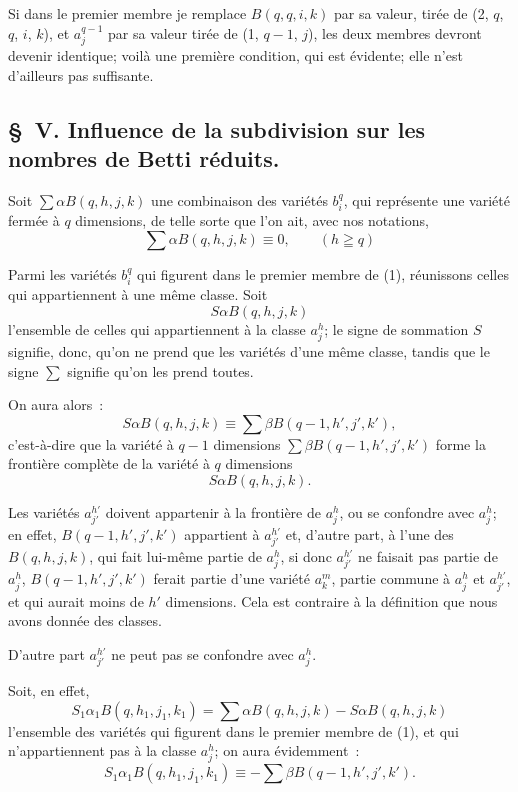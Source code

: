 \documentclass{article}
\begin{document}
Si dans le premier membre je remplace $B(q, q, i, k)$ par sa valeur, tirée de (2, $q$, $q$, $i$, $k$), et $a^{q-1}_{j}$ par sa valeur tirée de (1, $q - 1$, $j$), les deux membres devront devenir identique; voilà une première condition, qui est évidente; elle n'est d'ailleurs pas suffisante.

\subsection*{\S~V. Influence de la subdivision sur les nombres de Betti réduits.}

Soit $\displaystyle\sum \alpha B(q, h, j, k)$ une combinaison des variétés $b^{q}_{i}$, qui représente une variété fermée à $q$ dimensions, de telle sorte que l'on
ait, avec nos notations,
\[ \sum \alpha B(q, h, j, k) \equiv 0, \qquad (h \geqq q) \tag{1} \]

Parmi les variétés $b^{q}_{i}$ qui figurent dans le premier membre de (1), réunissons celles qui appartiennent à une même classe. Soit
\[ S \alpha B(q, h, j, k) \]
l'ensemble de celles qui appartiennent à la classe $a^{h}_{j}$; le signe de sommation $S$ signifie, donc, qu'on ne prend que les variétés d'une même classe, tandis que le signe $\displaystyle\sum$ signifie qu'on les prend toutes.

On aura alors~:
\[ S \alpha B(q, h, j, k) \equiv \sum \beta B(q - 1, h', j', k'), \tag{2} \]
c'est-à-dire que la variété à $q - 1$ dimensions $\displaystyle\sum \beta B(q - 1, h', j', k')$ forme la frontière complète de la variété à $q$ dimensions
\[ S \alpha B(q, h, j, k). \]

Les variétés $a^{h'}_{j'}$ doivent appartenir à la frontière de $a^{h}_{j}$, ou se confondre avec $a^{h}_{j}$; en effet, $B(q - 1, h', j', k')$ appartient à $a^{h'}_{j'}$ et, d'autre part, à l'une des $B(q, h, j, k)$, qui fait lui-même partie de $a^{h}_{j}$, si donc $a^{h'}_{j'}$ ne faisait pas partie de $a^{h}_{j}$, $B(q - 1, h', j', k')$ ferait partie d'une variété $a^{m}_{k}$, partie commune à $a^{h}_{j}$ et $a^{h'}_{j'}$, et qui aurait moins de $h'$ dimensions. Cela est contraire à la définition que nous avons donnée des classes.

D'autre part $a^{h'}_{j'}$ ne peut pas se confondre avec $a^{h}_{j}$.

Soit, en effet,
\[ S_{1} \alpha_{1} B(q, h_{1}, j_{1}, k_{1}) = \sum \alpha B(q, h, j, k) - S \alpha B(q, h, j, k) \]
l'ensemble des variétés qui figurent dans le premier membre de (1), et qui n'appartiennent pas à la classe $a^{h}_{j}$; on aura évidemment~:
\[ S_{1} \alpha_{1} B(q, h_{1}, j_{1}, k_{1}) \equiv - \sum \beta B(q - 1, h', j', k'). \]
\end{document}
